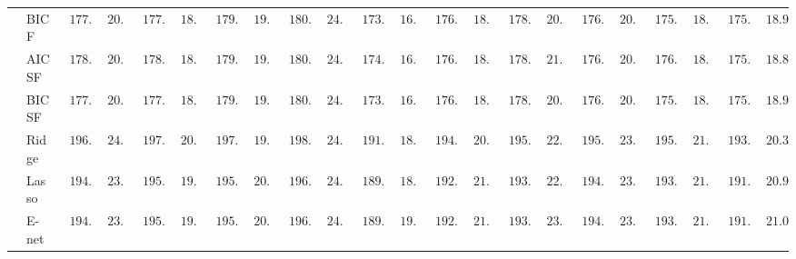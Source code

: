 \begin{tabular}{p{0.2cm}p{1cm}|p{0.6cm}p{0.6cm}|p{0.6cm}p{0.6cm}p{0.6cm}p{0.6cm}p{0.6cm}p{0.6cm}|p{0.6cm}p{0.6cm}p{0.6cm}p{0.6cm}p{0.6cm}p{0.6cm}|p{0.6cm}p{0.6cm}p{0.6cm}p{0.6cm}p{0.6cm}p{0.6cm}}
 & BIC F  & $\phantom{0}177.68$ & $\phantom{0}20.18$ & $\phantom{0}177.96$ & $\phantom{0}18.41$ & $\phantom{0}179.27$ & $\phantom{0}19.62$ & $\phantom{0}180.30$ & $\phantom{0}24.16$ & $\phantom{0}173.97$ & $\phantom{0}16.23$ & $\phantom{0}176.04$ & $\phantom{0}18.17$ & $\phantom{0}178.14$ & $\phantom{0}20.94$ & $\phantom{0}176.58$ & $\phantom{0}20.13$ & $\phantom{0}175.80$ & $\phantom{0}18.66$ & $\phantom{0}175.86$ & $\phantom{0}18.92$ \\
 & AIC SF  & $\phantom{0}178.14$ & $\phantom{0}20.33$ & $\phantom{0}178.14$ & $\phantom{0}18.34$ & $\phantom{0}179.45$ & $\phantom{0}19.77$ & $\phantom{0}180.28$ & $\phantom{0}24.28$ & $\phantom{0}174.29$ & $\phantom{0}16.46$ & $\phantom{0}176.02$ & $\phantom{0}18.09$ & $\phantom{0}178.18$ & $\phantom{0}21.00$ & $\phantom{0}176.90$ & $\phantom{0}20.13$ & $\phantom{0}176.21$ & $\phantom{0}18.51$ & $\phantom{0}175.89$ & $\phantom{0}18.87$ \\
 & BIC SF  & $\phantom{0}177.68$ & $\phantom{0}20.18$ & $\phantom{0}177.96$ & $\phantom{0}18.41$ & $\phantom{0}179.27$ & $\phantom{0}19.62$ & $\phantom{0}180.30$ & $\phantom{0}24.16$ & $\phantom{0}173.97$ & $\phantom{0}16.23$ & $\phantom{0}176.04$ & $\phantom{0}18.17$ & $\phantom{0}178.14$ & $\phantom{0}20.94$ & $\phantom{0}176.58$ & $\phantom{0}20.13$ & $\phantom{0}175.80$ & $\phantom{0}18.66$ & $\phantom{0}175.86$ & $\phantom{0}18.92$ \\
 & Ridge  & $\phantom{0}196.16$ & $\phantom{0}24.13$ & $\phantom{0}197.32$ & $\phantom{0}20.38$ & $\phantom{0}197.50$ & $\phantom{0}19.88$ & $\phantom{0}198.32$ & $\phantom{0}24.32$ & $\phantom{0}191.23$ & $\phantom{0}18.79$ & $\phantom{0}194.59$ & $\phantom{0}20.98$ & $\phantom{0}195.82$ & $\phantom{0}22.71$ & $\phantom{0}195.70$ & $\phantom{0}23.53$ & $\phantom{0}195.42$ & $\phantom{0}21.44$ & $\phantom{0}193.11$ & $\phantom{0}20.32$ \\
 & Lasso  & $\phantom{0}194.60$ & $\phantom{0}23.36$ & $\phantom{0}195.30$ & $\phantom{0}19.67$ & $\phantom{0}195.66$ & $\phantom{0}20.49$ & $\phantom{0}196.07$ & $\phantom{0}24.79$ & $\phantom{0}189.92$ & $\phantom{0}18.94$ & $\phantom{0}192.95$ & $\phantom{0}21.34$ & $\phantom{0}193.37$ & $\phantom{0}22.98$ & $\phantom{0}194.33$ & $\phantom{0}23.24$ & $\phantom{0}193.45$ & $\phantom{0}21.14$ & $\phantom{0}191.25$ & $\phantom{0}20.97$ \\
 & E-net  & $\phantom{0}194.69$ & $\phantom{0}23.36$ & $\phantom{0}195.41$ & $\phantom{0}19.89$ & $\phantom{0}195.78$ & $\phantom{0}20.46$ & $\phantom{0}196.08$ & $\phantom{0}24.77$ & $\phantom{0}189.92$ & $\phantom{0}19.01$ & $\phantom{0}192.92$ & $\phantom{0}21.52$ & $\phantom{0}193.44$ & $\phantom{0}23.21$ & $\phantom{0}194.55$ & $\phantom{0}23.47$ & $\phantom{0}193.55$ & $\phantom{0}21.00$ & $\phantom{0}191.24$ & $\phantom{0}21.06$ \\

\end{tabular}
